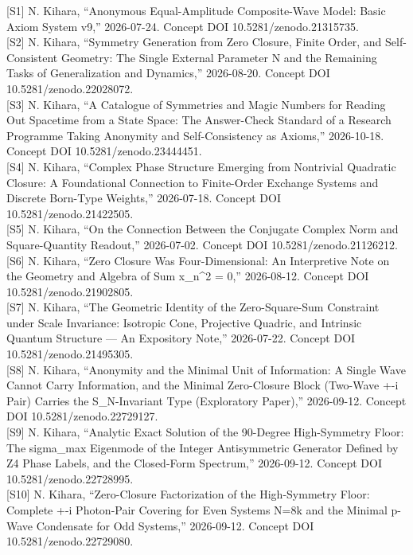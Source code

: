 \documentclass[
  a4paper,
]{article}
\begin{document}
{[}S1{]} N. Kihara, ``Anonymous Equal-Amplitude Composite-Wave Model:
Basic Axiom System v9,'' 2026-07-24. Concept DOI
10.5281/zenodo.21315735.\\
{[}S2{]} N. Kihara, ``Symmetry Generation from Zero Closure, Finite
Order, and Self-Consistent Geometry: The Single External Parameter N and
the Remaining Tasks of Generalization and Dynamics,'' 2026-08-20.
Concept DOI 10.5281/zenodo.22028072.\\
{[}S3{]} N. Kihara, ``A Catalogue of Symmetries and Magic Numbers for
Reading Out Spacetime from a State Space: The Answer-Check Standard of a
Research Programme Taking Anonymity and Self-Consistency as Axioms,''
2026-10-18. Concept DOI 10.5281/zenodo.23444451.\\
{[}S4{]} N. Kihara, ``Complex Phase Structure Emerging from Nontrivial
Quadratic Closure: A Foundational Connection to Finite-Order Exchange
Systems and Discrete Born-Type Weights,'' 2026-07-18. Concept DOI
10.5281/zenodo.21422505.\\
{[}S5{]} N. Kihara, ``On the Connection Between the Conjugate Complex
Norm and Square-Quantity Readout,'' 2026-07-02. Concept DOI
10.5281/zenodo.21126212.\\
{[}S6{]} N. Kihara, ``Zero Closure Was Four-Dimensional: An Interpretive
Note on the Geometry and Algebra of Sum x\_n\^{}2 = 0,'' 2026-08-12.
Concept DOI 10.5281/zenodo.21902805.\\
{[}S7{]} N. Kihara, ``The Geometric Identity of the Zero-Square-Sum
Constraint under Scale Invariance: Isotropic Cone, Projective Quadric,
and Intrinsic Quantum Structure --- An Expository Note,'' 2026-07-22.
Concept DOI 10.5281/zenodo.21495305.\\
{[}S8{]} N. Kihara, ``Anonymity and the Minimal Unit of Information: A
Single Wave Cannot Carry Information, and the Minimal Zero-Closure Block
(Two-Wave +-i Pair) Carries the S\_N-Invariant Type (Exploratory
Paper),'' 2026-09-12. Concept DOI 10.5281/zenodo.22729127.\\
{[}S9{]} N. Kihara, ``Analytic Exact Solution of the 90-Degree
High-Symmetry Floor: The sigma\_max Eigenmode of the Integer
Antisymmetric Generator Defined by Z4 Phase Labels, and the Closed-Form
Spectrum,'' 2026-09-12. Concept DOI 10.5281/zenodo.22728995.\\
{[}S10{]} N. Kihara, ``Zero-Closure Factorization of the High-Symmetry
Floor: Complete +-i Photon-Pair Covering for Even Systems N=8k and the
Minimal p-Wave Condensate for Odd Systems,'' 2026-09-12. Concept DOI
10.5281/zenodo.22729080.\\
\end{document}
